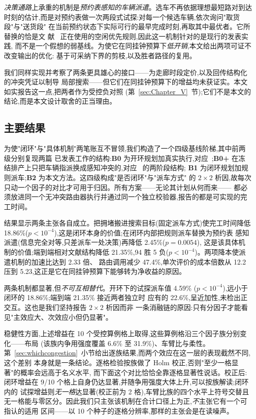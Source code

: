 \documentclass[manuscript,screen,review]{acmart}
\newcommand{\NCases}{10}
\newcommand{\NSeeds}{10}
\newcommand{\GainLoopRule}{18.86\%}      %
\newcommand{\PLoopRule}{<10^{-4}}
\newcommand{\GainProbeOpen}{4.59\%}      %
\newcommand{\PProbeOpen}{<10^{-4}}
\newcommand{\GainProbeLoop}{2.45\%}      %
\newcommand{\PProbeLoop}{=0.0054}
\newcommand{\GainEndToEnd}{21.35\%}      %
\newcommand{\PEndToEnd}{<10^{-4}}
\newcommand{\WinEndToEnd}{94}
\newcommand{\LoseEndToEnd}{5}
\newcommand{\GainIndepProduct}{22.6\%}
\newcommand{\CellsSigLoopAdj}{9}
\newcommand{\CellsSigProbe}{2}
\newcommand{\ContentionLo}{6.6\%}
\newcommand{\ContentionAHi}{31.9\%}
\newcommand{\SpeedupProbe}{2.33}
\newcommand{\RouteCallCut}{47.4\%}
\newcommand{\CostMultBefore}{12.2}
\newcommand{\CostMultAfter}{5.23}
\begin{document}
\emph{决策通路}上承重的机制是\emph{预约表感知的车辆派遣}。选车不再依据理想最短路对到达
时刻的估计,而是对预约表做一次两段式试探:对每一个候选车辆,依次询问"取货段"与"送货段"
在当前预约状态下实际可行的最早完成时刻,再取其中最优者。它所替换的恰是文
献~\cite{li2026framework} 正在使用的空闲优先规则,因此这一机制针对的是现行的发表实践,
而不是一个假想的弱基线。为使它在同挂钟预算下\emph{低开销},本文给出两项可证不改变输出的优化:
基于可采纳下界的剪枝,以及胜者路径的复用。

我们同样实现并考察了两条更具雄心的接口——为走廊时段定价,以及回传结构化的冲突凭证以制导
局部搜索——但它们在同挂钟预算下的增益均未获证实。本文如实报告这一点,把两者作为受控负对照
(第~\ref{sec:Chapter_V}~节);它们不是本文的结论,而是本文设计取舍的正当理由。

\subsection{主要结果}

为使"闭环"与"具体机制"两笔账互不冒领,我们构造了一个四级基线阶梯,其中前两级分别复现两篇
已发表工作的结构:\textbf{B0} 为开环规划加真实执行,对应~\cite{li2026framework};\textbf{B0+}
在冻结排产上只把车辆指派换成感知冲突的,对应~\cite{sun2023integrated} 的两阶段结构;
\textbf{B1} 为闭环规划加规则派车;\textbf{B2} 为本文方法。这四级构成"是否闭环"与"派车方式"
的 $2\times 2$ 析因,故每次只动一个因子的对比才可用于归因。所有方案——无论其计划从何而来——
都必须放进同一个无冲突路由器执行并通过同一个独立校验器,报告的都是可实现的完工时间。

结果显示两条主张各自成立。把拥堵搬进搜索目标(固定派车方式)使完工时间降低
\GainLoopRule{}($p\PLoopRule$),这是闭环本身的价值;在闭环内部把规则派车替换为预约表
感知派遣(信息完全对等,只差派车一处决策)再降低 \GainProbeLoop{}($p\PProbeLoop$),
这是该具体机制的价值;端到端相对文献结构降低 \GainEndToEnd{},\WinEndToEnd{} 胜
\LoseEndToEnd{} 负($p\PEndToEnd$)。两项降本使派遣机制的加速比达到 \SpeedupProbe{} 倍、
路由调用减少 \RouteCallCut{},单次评价的成本倍数从 \CostMultBefore{} 压到
\CostMultAfter{},这正是它在同挂钟预算下能够转为净收益的原因。

两条机制都显著,但\emph{不可互相替代}。开环下的试探派车值 \GainProbeOpen{}
($p\PProbeOpen$),远小于闭环的 \GainLoopRule{};端到端 \GainEndToEnd{} 接近两者独立时
应有的 \GainIndepProduct{},呈近加性,未检出正交互。这也是我们坚持报告 $2\times 2$ 析因而非
一条消融链的原因:只有分因子才能看见"主效应大、次效应小但仍显著"。

稳健性方面,上述增益在 \NCases{} 个受控算例格上取得,这些算例格沿三个因子族分别变化——布局
(该族内争用强度覆盖 \ContentionLo{} 至 \ContentionAHi{})、车臂比与柔性。
第~\ref{sec:whichcongestion}~小节给出逐族结果,而两个效应在这一层的表现截然不同,这个差别
本身就是一条结论。逐格检验按族做了 Holm 校正,否则"至少一格显著"的概率会远高于名义水平,
而下面这个对比恰恰全靠逐格显著性说话。校正后:闭环增益在
\CellsSigLoopAdj{}/\NCases{} 个格上自身仍达显著,并随争用强度大体上升,可以按族解读;闭环内的
试探增益则\emph{无一格}达显著(校正前为 \CellsSigProbe{} 格),车臂比族的四个水平上符号交替且
无一格能与零区分。因此我们只主张该机制在合计口径上为正,\emph{不}主张它有一个可指认的适用
区间——以 \NSeeds{} 个种子的逐格分辨率,那样的主张会是在读噪声。
\end{document}
